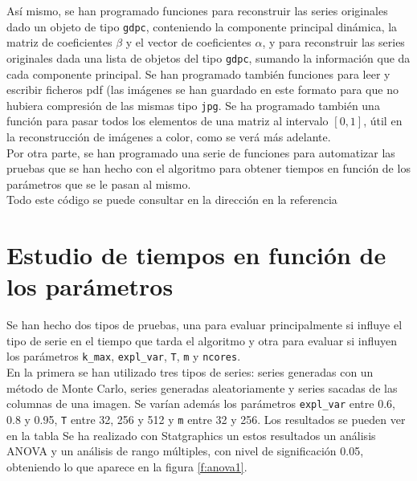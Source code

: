 Así mismo, se han programado funciones para reconstruir las series originales dado un objeto de tipo \texttt{gdpc}, conteniendo la componente principal dinámica, la matriz de coeficientes $\beta$ y el vector de coeficientes $\alpha$, y para reconstruir las series originales dada una lista de objetos del tipo \texttt{gdpc}, sumando la información que da cada componente principal. Se han programado también funciones para leer y escribir ficheros pdf (las imágenes se han guardado en este formato para que no hubiera compresión de las mismas tipo \texttt{jpg}. Se ha programado también una función para pasar todos los elementos de una matriz al intervalo $[0,1]$, útil en la reconstrucción de imágenes a color, como se verá más adelante.\\

Por otra parte, se han programado una serie de funciones para automatizar las pruebas que se han hecho con el algoritmo para obtener tiempos en función de los parámetros que se le pasan al mismo.\\

Todo este código se puede consultar en la dirección en la referencia %


\section{Estudio de tiempos en función de los parámetros}

Se han hecho dos tipos de pruebas, una para evaluar principalmente si influye el tipo de serie en el tiempo que tarda el algoritmo y otra para evaluar si influyen los parámetros \texttt{k\_max}, \texttt{expl\_var}, \texttt{T}, \texttt{m} y \texttt{ncores}.\\

En la primera se han utilizado tres tipos de series: series generadas con un método de Monte Carlo, series generadas aleatoriamente y series sacadas de las columnas de una imagen. Se varían además los parámetros \texttt{expl\_var} entre 0.6, 0.8 y 0.95, \texttt{T} entre 32, 256 y 512 y \texttt{m} entre 32 y 256. Los resultados se pueden ver en la tabla %
Se ha realizado con Statgraphics un estos resultados un análisis ANOVA y un análisis de rango múltiples, con nivel de significación 0.05, obteniendo lo que aparece en la figura \ref{f:anova1}.\\

